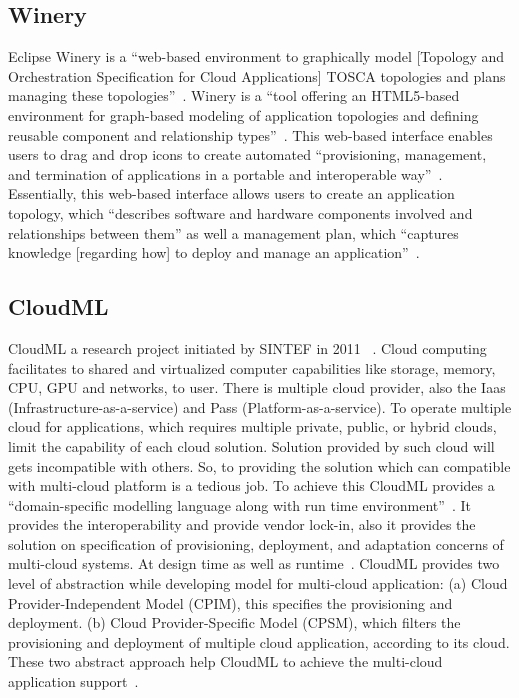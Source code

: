 \subsection{Winery \cv}

Eclipse Winery is a ``web-based environment to graphically model
[Topology and Orchestration Specification for Cloud Applications]
TOSCA topologies and plans managing these
topologies''~\cite{www-winery}. Winery is a ``tool offering an
HTML5-based environment for graph-based modeling of application
topologies and defining reusable component and relationship
types''~\cite{winery-paper-2013}. This web-based interface enables
users to drag and drop icons to create automated ``provisioning,
management, and termination of applications in a portable and
interoperable way''~\cite{winery-paper-2013}.  Essentially, this
web-based interface allows users to create an application topology,
which ``describes software and hardware components involved and
relationships between them'' as well a management plan, which
``captures knowledge [regarding how] to deploy and manage an
application''~\cite{winery-paper-2013}.

     \pv
     

\subsection{CloudML}
                                                            
CloudML a research project initiated by SINTEF in 2011
~\cite{www-cloudml}. Cloud computing facilitates to shared and
virtualized computer capabilities like storage, memory, CPU, GPU and
networks, to user. There is multiple cloud provider, also the Iaas
(Infrastructure-as-a-service) and Pass (Platform-as-a-service). To
operate multiple cloud for applications, which requires multiple
private, public, or hybrid clouds, limit the capability of each cloud
solution.  Solution provided by such cloud will gets incompatible with
others. So, to providing the solution which can compatible with
multi-cloud platform is a tedious job. To achieve this CloudML
provides a ``domain-specific modelling language along with run time
environment''~\cite{www-cloudml}. It provides the interoperability and
provide vendor lock-in, also it provides the solution on specification
of provisioning, deployment, and adaptation concerns of multi-cloud
systems. At design time as well as runtime~\cite{www-cloudml}.
CloudML provides two level of abstraction while developing model for
multi-cloud application: (a) Cloud Provider-Independent Model (CPIM),
this specifies the provisioning and deployment.  (b) Cloud
Provider-Specific Model (CPSM), which filters the provisioning and
deployment of multiple cloud application, according to its cloud.
These two abstract approach help CloudML to achieve the multi-cloud
application support~\cite{www-cloudmlwiki}.

